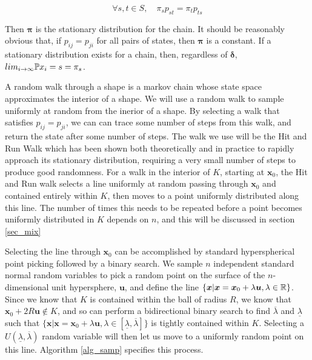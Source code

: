 $$
\forall s,t \in S, \quad \pi_s p_{st} = \pi_t p_{ts}
$$

Then $\bm{\pi}$ is the stationary distribution for the chain. It should be reasonably obvious that, if $p_{ij} = p_{ji}$ for all pairs of states, then $\bm{\pi}$ is a constant. If a stationary distribution exists for a chain, then, regardless of $\bm{\delta}$, $lim_{i-> \infty} \mathbb{P} {x_i = s} = \pi_s$.

A random walk through a shape is a markov chain whose state space approximates the interior of a shape. We will use a random walk to sample uniformly at random from the inerior of a shape. By selecting a walk that satisfies $p_{ij} = p_{ji}$, we can can trace some number of steps from this walk, and return the state after some number of steps. The walk we use will be the Hit and Run Walk %
which has been shown both theoretically and in practice to rapidly approach its stationary distribution, requiring a very small number of steps to produce good randomness. For a walk in the interior of $K$, starting at $\bm{x}_0$, the Hit and Run walk selects a line uniformly at random passing through $\bm{x}_0$ and contained entirely within $K$, then moves to a point uniformly distributed along this line. The number of times this needs to be repeated before a point becomes uniformly distributed in $K$ depends on $n$, and this will be discussed in section \ref{sec_mix}

Selecting the line through $\bm{x}_0$ can be accomplished by standard hyperspherical point picking %
followed by a binary search. We sample $n$ independent standard normal random variables to pick a random point on the surface of the $n$-dimensional unit hypersphere, $\bm{u}$, and define the line $\{\bm{x} | \bm{x} = \bm{x}_0 + \lambda \bm{u}, \lambda \in \mathbb{R} \}$. Since we know that $K$ is contained within the ball of radius $R$, we know that $\bm{x}_0 + 2R\bm{u} \notin K$, and so can perform a bidirectional binary search to find $\overline{\lambda}$ and $\underline{\lambda}$ such that $\{\bm{x} | \bm{x} = \bm{x}_0 + \lambda \bm{u}, \lambda \in [\underline{\lambda}, \overline{\lambda}] \}$ is tightly contained within $K$. Selecting a $U(\underline{\lambda}, \overline{\lambda})$ random variable will then let us move to a uniformly random point on this line. Algorithm \ref{alg_samp} specifies this process.

